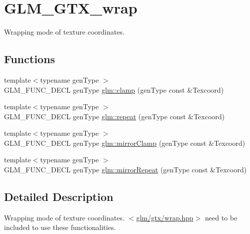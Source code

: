 \hypertarget{group__gtx__wrap}{\section{G\-L\-M\-\_\-\-G\-T\-X\-\_\-wrap}
\label{group__gtx__wrap}
}


Wrapping mode of texture coordinates.  


\subsection*{Functions}
\begin{DoxyCompactItemize}
\item 
{\footnotesize template$<$typename gen\-Type $>$ }\\G\-L\-M\-\_\-\-F\-U\-N\-C\-\_\-\-D\-E\-C\-L gen\-Type \hyperlink{group__gtx__wrap_ga6c0cc6bd1d67ea1008d2592e998bad33}{glm\-::clamp} (gen\-Type const \&Texcoord)
\item 
{\footnotesize template$<$typename gen\-Type $>$ }\\G\-L\-M\-\_\-\-F\-U\-N\-C\-\_\-\-D\-E\-C\-L gen\-Type \hyperlink{group__gtx__wrap_ga809650c6310ea7c42666e918c117fb6f}{glm\-::repeat} (gen\-Type const \&Texcoord)
\item 
{\footnotesize template$<$typename gen\-Type $>$ }\\G\-L\-M\-\_\-\-F\-U\-N\-C\-\_\-\-D\-E\-C\-L gen\-Type \hyperlink{group__gtx__wrap_gaa6856a0a048d2749252848da35e10c8b}{glm\-::mirror\-Clamp} (gen\-Type const \&Texcoord)
\item 
{\footnotesize template$<$typename gen\-Type $>$ }\\G\-L\-M\-\_\-\-F\-U\-N\-C\-\_\-\-D\-E\-C\-L gen\-Type \hyperlink{group__gtx__wrap_ga16a89b0661b60d5bea85137bbae74d73}{glm\-::mirror\-Repeat} (gen\-Type const \&Texcoord)
\end{DoxyCompactItemize}


\subsection{Detailed Description}
Wrapping mode of texture coordinates. $<$\hyperlink{wrap_8hpp}{glm/gtx/wrap.\-hpp}$>$ need to be included to use these functionalities. 

